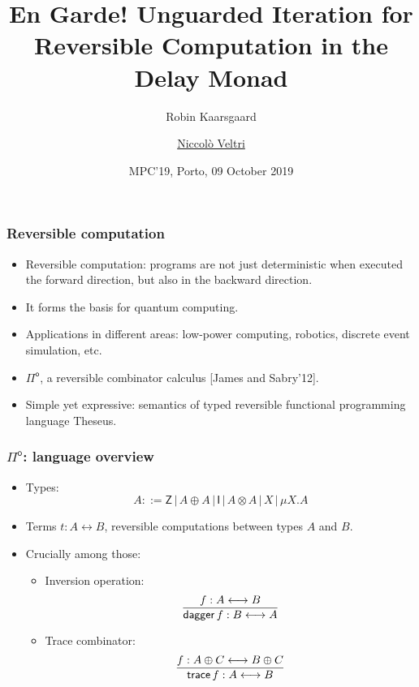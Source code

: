 \documentclass[12pt,t]{beamer}
\newcommand{\Pio}{\ensuremath{\mathsf{\Pi}^{\mathsf{o}}}}
\newcommand{\lr}{\longleftrightarrow}
\newcommand{\trace}{\ensuremath{\mathsf{trace}}}
\newcommand{\Z}{\mathsf{Z}}
\newcommand{\I}{\mathsf{I}}
\renewcommand{\dagger}{\mathsf{dagger}}
\begin{document}

\title{En Garde! Unguarded Iteration for Reversible Computation in the
  Delay Monad}


\author{Robin Kaarsgaard \and \underline{Niccol\`o Veltri}}
\date{MPC'19, Porto, 09 October 2019}

\begin{frame}

\maketitle

\end{frame}


\begin{frame}

  \frametitle{Reversible computation}

  \begin{itemize}

  \item Reversible computation: programs are not just deterministic when
    executed the forward direction, but also in the
    backward direction.
  \item It forms the basis for quantum computing.
  \item Applications in different areas: low-power computing, robotics,
    discrete event simulation, etc.

    \pause
    \vspace{\fill}
    
  \item \Pio, a reversible combinator calculus [James and Sabry'12].
  \item Simple yet expressive: semantics of typed reversible
    functional programming language Theseus.
  \end{itemize}

\end{frame}

\begin{frame}

  \frametitle{\Pio: language overview}

  \begin{itemize}

  \item Types:
    \[
    A ::= \Z \, | \,A \oplus A \, | \,\I \,| \,A \otimes A \,| \,X \,|
    \,\mu X.A
    \]
  \item Terms $t : A \lr B$, reversible computations between types $A$
    and $B$.
  \item Crucially among those:
    \begin{itemize}          
    \item Inversion operation:
      \[
      \infer{\dagger \,f : B \lr A}{f : A \lr B}
      \]
    \item Trace combinator:
      \[
      \infer{\trace \,f: A \lr B}{f : A \oplus C \lr B \oplus C}
      \]
    \end{itemize}    
  \end{itemize}
  
\end{frame}
\end{document}
